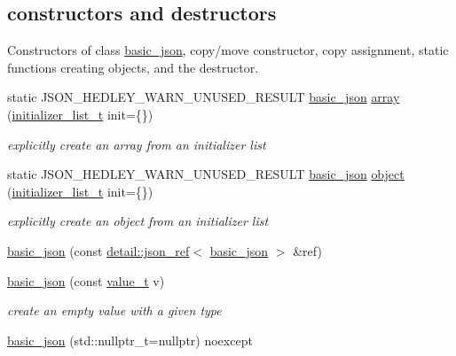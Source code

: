 \subsection*{constructors and destructors}
\label{_amgrpd94b4d3d0135946bb7bdf25e48755337}%
Constructors of class \hyperlink{classnlohmann_1_1basic__json}{basic\+\_\+json}, copy/move constructor, copy assignment, static functions creating objects, and the destructor. \begin{DoxyCompactItemize}
\item 
static J\+S\+O\+N\+\_\+\+H\+E\+D\+L\+E\+Y\+\_\+\+W\+A\+R\+N\+\_\+\+U\+N\+U\+S\+E\+D\+\_\+\+R\+E\+S\+U\+LT \hyperlink{classnlohmann_1_1basic__json}{basic\+\_\+json} \hyperlink{classnlohmann_1_1basic__json_a8a7d537fc297bbc5b845f92fe0445e3b}{array} (\hyperlink{classnlohmann_1_1basic__json_a670f6a0eb3d1e0ffd00c27d35472ccc9}{initializer\+\_\+list\+\_\+t} init=\{\})
\begin{DoxyCompactList}\small\item\em explicitly create an array from an initializer list \end{DoxyCompactList}\item 
static J\+S\+O\+N\+\_\+\+H\+E\+D\+L\+E\+Y\+\_\+\+W\+A\+R\+N\+\_\+\+U\+N\+U\+S\+E\+D\+\_\+\+R\+E\+S\+U\+LT \hyperlink{classnlohmann_1_1basic__json}{basic\+\_\+json} \hyperlink{classnlohmann_1_1basic__json_a31f84ee15c4690ff705bed74736d04c6}{object} (\hyperlink{classnlohmann_1_1basic__json_a670f6a0eb3d1e0ffd00c27d35472ccc9}{initializer\+\_\+list\+\_\+t} init=\{\})
\begin{DoxyCompactList}\small\item\em explicitly create an object from an initializer list \end{DoxyCompactList}\item 
\hyperlink{classnlohmann_1_1basic__json_a2be0a411fe0e3418abc4c58889be4943}{basic\+\_\+json} (const \hyperlink{classnlohmann_1_1detail_1_1json__ref}{detail\+::json\+\_\+ref}$<$ \hyperlink{classnlohmann_1_1basic__json}{basic\+\_\+json} $>$ \&ref)
\item 
\hyperlink{classnlohmann_1_1basic__json_aed115142bd0c6c66c864700e0467df55}{basic\+\_\+json} (const \hyperlink{namespacenlohmann_1_1detail_a1ed8fc6239da25abcaf681d30ace4985}{value\+\_\+t} v)
\begin{DoxyCompactList}\small\item\em create an empty value with a given type \end{DoxyCompactList}\item 
\hyperlink{classnlohmann_1_1basic__json_ae9be9e956bfc4658f35d17c6aa72b063}{basic\+\_\+json} (std\+::nullptr\+\_\+t=nullptr) noexcept

\end{DoxyCompactItemize}
